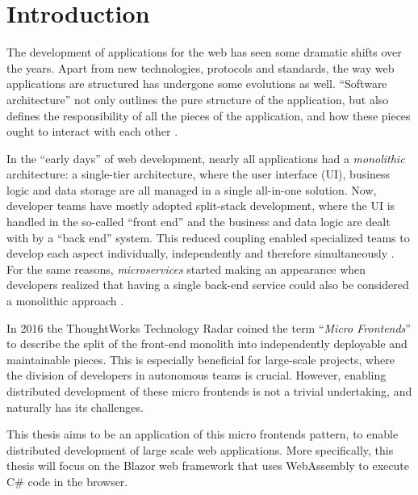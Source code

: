
\section{Introduction}
\label{sec:introduction}

The development of applications for the web has seen some dramatic shifts over
the years. Apart from new technologies, protocols and standards, the way web
applications are structured has undergone some evolutions as well. ``Software
architecture'' not only outlines the pure structure of the application, but also
defines the responsibility of all the pieces of the application, and how these
pieces ought to interact with each other \autocite{Fedorov_etal_1998}.

In the ``early days'' of web development, nearly all applications had a
\textit{monolithic} architecture: a single-tier architecture, where the user
interface (UI), business logic and data storage are all managed in a single
all-in-one solution. Now, developer teams have mostly adopted split-stack
development, where the UI is handled in the so-called ``front end'' and the
business and data logic are dealt with by a ``back end'' system. This reduced
coupling enabled specialized teams to develop each aspect individually,
independently and therefore simultaneously \autocite{Dunkley_2016}. For the same
reasons, \textit{microservices} started making an appearance when developers
realized that having a single back-end service could also be considered a
monolithic approach \autocite{Fowler_Microservices_2014}.

In 2016 the ThoughtWorks Technology Radar \autocite{ThoughtWorks_2020} coined
the term ``\textit{Micro Frontends}'' to describe the split of the front-end
monolith into independently deployable and maintainable pieces. This is
especially beneficial for large-scale projects, where the division of developers
in autonomous teams is crucial. However, enabling distributed development of
these micro frontends is not a trivial undertaking, and naturally has its
challenges.

This thesis aims to be an application of this micro frontends pattern, to enable
distributed development of large scale web applications. More specifically, this
thesis will focus on the Blazor web framework
that uses WebAssembly to execute C\# code
in the browser.

